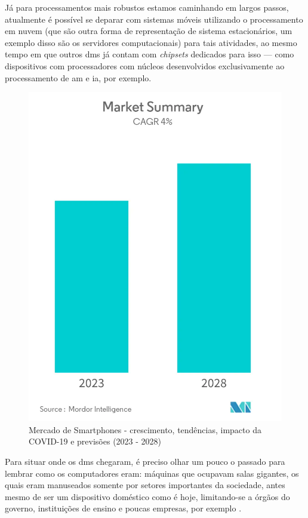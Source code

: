 Já para processamentos mais robustos estamos caminhando em largos passos, atualmente é possível se deparar com sistemas móveis utilizando o processamento em nuvem (que são outra forma de representação de sistema estacionários, um exemplo disso são os servidores computacionais) para tais atividades, ao mesmo tempo em que outros \acp{dm} já contam com \textit{chipsets} dedicados para isso — como dispositivos com processadores com núcleos desenvolvidos exclusivamente ao processamento de \ac{am} e \ac{ia}, por exemplo.

\begin{figure}[h]
\centering
  \includegraphics[width=\columnwidth/3]{images/smartphones-market_Market_Summary.png}
  \caption{Mercado de Smartphones - crescimento, tendências, impacto da COVID-19 e previsões (2023 - 2028)}
  \label{fig:smartphones-market_Market_Summary}
\end{figure}

Para situar onde os \acp{dm} chegaram, é preciso olhar um pouco o passado para lembrar como os computadores eram: máquinas que ocupavam salas gigantes, os quais eram manuseados somente por setores importantes da sociedade, antes mesmo de ser um dispositivo doméstico como é hoje, limitando-se a órgãos do governo, instituições de ensino e poucas empresas, por exemplo \citet{alecrim_2013}.

